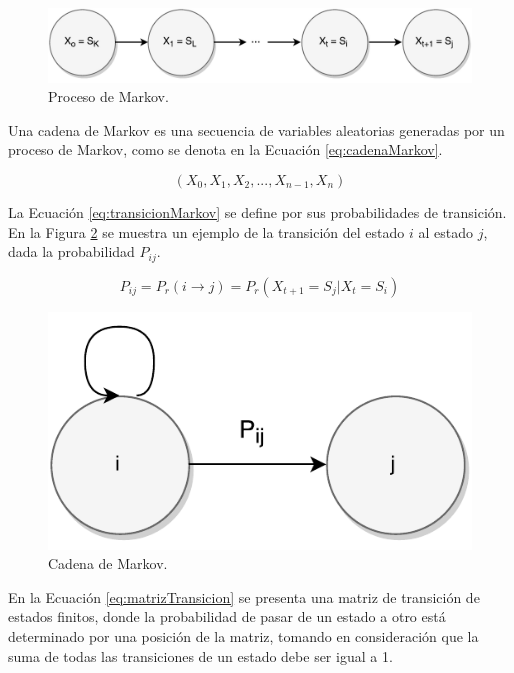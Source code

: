 \begin{figure}[ht!]
  \centering
    \includegraphics[scale=0.6]{images/ProcesoMarkov.pdf}
  \caption{Proceso de Markov.}
  \label{fig:procesoMarkov}
\end{figure}

Una cadena de Markov es una secuencia de variables aleatorias generadas por un proceso de Markov, como se denota en la Ecuación \ref{eq:cadenaMarkov}.

\begin{equation} \label{eq:cadenaMarkov}
	(X_0, X_1, X_2, ..., X_{n-1}, X_{n})
\end{equation}

La Ecuación \ref{eq:transicionMarkov} se define por sus probabilidades de transición. En la Figura \ref{fig:cadenaMarkov} se muestra un ejemplo de la transición del estado $i$ al estado $j$, dada la probabilidad $P_{ij}$.

\begin{equation} \label{eq:transicionMarkov}
	P_{ij} = P_r(i \rightarrow j) = P_r(X_{t+1} = S_j | X_t = S_i)
\end{equation}

\begin{figure}[ht!]
  \centering
    \includegraphics[scale=0.6]{images/CadenaMarkov.pdf}
  \caption{Cadena de Markov.}
  \label{fig:cadenaMarkov}
\end{figure}

En la Ecuación \ref{eq:matrizTransicion} se presenta una matriz de transición de estados finitos, donde la probabilidad de pasar de un estado a otro está determinado por una posición de la matriz, tomando en consideración que la suma de todas las transiciones de un estado debe ser igual a 1.

